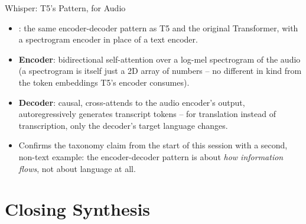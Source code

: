 \begin{vbframe}{Whisper: T5's Pattern, for Audio}

\vfill

\begin{itemize}
	\item {}: the same encoder-decoder pattern as T5 and the original Transformer, with a spectrogram encoder in place of a text encoder.
	\item \textbf{Encoder}: bidirectional self-attention over a log-mel spectrogram of the audio (a spectrogram is itself just a 2D array of numbers -- no different in kind from the token embeddings T5's encoder consumes).
	\item \textbf{Decoder}: causal, cross-attends to the audio encoder's output, autoregressively generates transcript tokens -- for translation instead of transcription, only the decoder's target language changes.
	\item Confirms the taxonomy claim from the start of this session with a second, non-text example: the encoder-decoder pattern is about \emph{how information flows}, not about language at all.
\end{itemize}

\vfill

\end{vbframe}


\section{Closing Synthesis}

